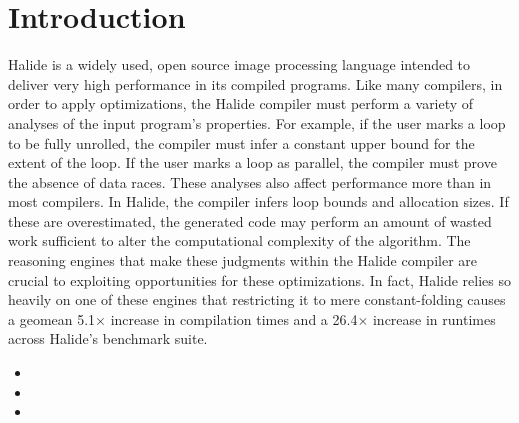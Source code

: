 \chapter{Introduction}
\label{sec:intro}

Halide is a widely used, open source image processing language intended to deliver very high performance in its compiled programs. Like many compilers, in order to apply optimizations, the Halide compiler must perform a variety of analyses of
  the input program's properties. For example, if the user marks a
  loop to be fully unrolled, the compiler must infer a constant upper
  bound for the extent of the loop. If the user marks
  a loop as parallel, the compiler must prove the absence of data
  races. These analyses also affect performance more than in most
  compilers. In Halide, the compiler infers loop bounds and allocation sizes.
  If these are overestimated, the generated code may
  perform an amount of wasted work sufficient to alter the
  computational complexity of the algorithm. The reasoning engines that make these judgments within the Halide compiler are crucial to exploiting opportunities for these optimizations.
  In fact, Halide relies so heavily on one of these engines that restricting it
  to mere constant-folding causes a geomean 5.1$\times$ increase in
  compilation times and a 26.4$\times$ increase in runtimes across
  Halide's benchmark suite.


\begin{itemize}
  \item {}
  \item {}
  \item {}
\end{itemize}


